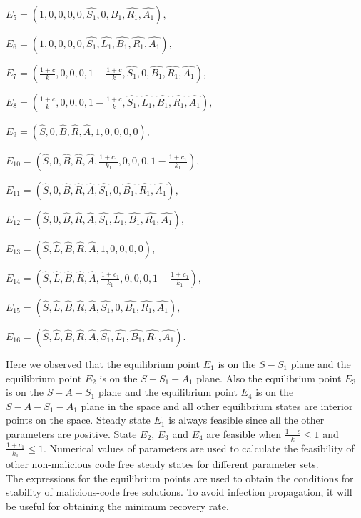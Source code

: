 $E_{5} =(1,0,0,0,0,\hat{S_1},0,\hat{B_1},\hat{R_1},\hat{A_1}) \label{eq:E5},$

$E_{6} =(1,0,0,0,0,\hat{S_1},\hat{L_1},\hat{B_1},\hat{R_1},\hat{A_1}) \label{eq:E6},$

$E_{7} =(\frac{1+c}{k},0,0,0,1-\frac{1+c}{k},\hat{S_1},0,\hat{B_1},\hat{R_1},\hat{A_1})\label{eq:E7},$

$E_{8} =(\frac{1+c}{k},0,0,0,1-\frac{1+c}{k},\hat{S_1},\hat{L_1},\hat{B_1},\hat{R_1},\hat{A_1})\label{eq:E8},$

$E_{9} =(\hat{S},0,\hat{B},\hat{R},\hat{A},1,0,0,0,0) \label{eq:E9},$

$E_{10} =(\hat{S},0,\hat{B},\hat{R},\hat{A},\frac{1+c_1}{k_1},0,0,0,1-\frac{1+c_1}{k_1}) \label{eq:E10},$

$E_{11} =(\hat{S},0,\hat{B},\hat{R},\hat{A},\hat{S_1},0,\hat{B_1},\hat{R_1},\hat{A_1}) \label{eq:E11},$

$E_{12} =(\hat{S},0,\hat{B},\hat{R},\hat{A},\hat{S_1},\hat{L_1},\hat{B_1},\hat{R_1},\hat{A_1}) \label{eq:E12},$

$E_{13} =(\hat{S},\hat{L},\hat{B},\hat{R},\hat{A},1,0,0,0,0) \label{eq:E13},$

$E_{14} =(\hat{S},\hat{L},\hat{B},\hat{R},\hat{A},\frac{1+c_1}{k_1},0,0,0,1-\frac{1+c_1}{k_1}) \label{eq:E14},$

$E_{15} =(\hat{S},\hat{L},\hat{B},\hat{R},\hat{A},\hat{S_1},0,\hat{B_1},\hat{R_1},\hat{A_1}) \label{eq:E15},$

$E_{16} =(\hat{S},\hat{L},\hat{B},\hat{R},\hat{A},\hat{S_1},\hat{L_1} ,\hat{B_1},\hat{R_1},\hat{A_1}) \label{eq:E16}.$


\noindent Here we observed that the equilibrium point $E_1$ is on the $S-S_1$ plane and the equilibrium point  $E_2$ is on the $S-S_1-A_1$ plane. Also the equilibrium point $E_3$ is on the $S-A-S_1$ plane and the equilibrium point $E_4$ is on the $S-A-S_1-A_1$ plane in the space and all other equilibrium states are interior points on the space. Steady state $E_1$ is always feasible since all the other parameters are positive. State $E_2$, $E_3$ and $E_4$ are feasible when $\frac{1+c}{k} \leq 1$ and $\frac{1+c_{1}}{k_{1}} \leq 1.$ Numerical values of parameters are used to calculate the feasibility of other non-malicious code free steady states for different parameter sets.\\
The expressions for the equilibrium points are used to obtain the conditions for stability of malicious-code free solutions. To avoid infection propagation, it will be useful for obtaining the minimum recovery rate.

